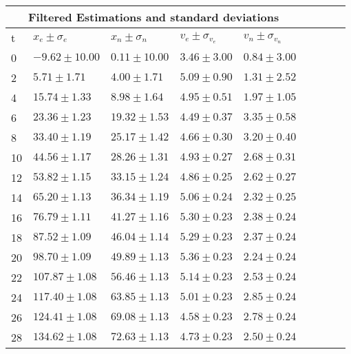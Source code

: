 \begin{table}[h] 
   \begin{center} 
      \begin{tabular}{lllllllll}\toprule 
\multicolumn{5}{c}{Filtered Estimations and standard deviations}\\ 
\midrule 
t&  $x_e \pm \sigma_e$& $x_n \pm \sigma_n$& $v_e \pm \sigma_{v_e}$& $v_n \pm \sigma_{v_n}$\\ \midrule 
0 & $   -9.62 \pm    10.00$ & $    0.11 \pm    10.00$ & $    3.46 \pm     3.00$ & $    0.84 \pm     3.00$  \\ 
2 & $    5.71 \pm     1.71$ & $    4.00 \pm     1.71$ & $    5.09 \pm     0.90$ & $    1.31 \pm     2.52$  \\ 
4 & $   15.74 \pm     1.33$ & $    8.98 \pm     1.64$ & $    4.95 \pm     0.51$ & $    1.97 \pm     1.05$  \\ 
6 & $   23.36 \pm     1.23$ & $   19.32 \pm     1.53$ & $    4.49 \pm     0.37$ & $    3.35 \pm     0.58$  \\ 
8 & $   33.40 \pm     1.19$ & $   25.17 \pm     1.42$ & $    4.66 \pm     0.30$ & $    3.20 \pm     0.40$  \\ 
10 & $   44.56 \pm     1.17$ & $   28.26 \pm     1.31$ & $    4.93 \pm     0.27$ & $    2.68 \pm     0.31$  \\ 
12 & $   53.82 \pm     1.15$ & $   33.15 \pm     1.24$ & $    4.86 \pm     0.25$ & $    2.62 \pm     0.27$  \\ 
14 & $   65.20 \pm     1.13$ & $   36.34 \pm     1.19$ & $    5.06 \pm     0.24$ & $    2.32 \pm     0.25$  \\ 
16 & $   76.79 \pm     1.11$ & $   41.27 \pm     1.16$ & $    5.30 \pm     0.23$ & $    2.38 \pm     0.24$  \\ 
18 & $   87.52 \pm     1.09$ & $   46.04 \pm     1.14$ & $    5.29 \pm     0.23$ & $    2.37 \pm     0.24$  \\ 
20 & $   98.70 \pm     1.09$ & $   49.89 \pm     1.13$ & $    5.36 \pm     0.23$ & $    2.24 \pm     0.24$  \\ 
22 & $  107.87 \pm     1.08$ & $   56.46 \pm     1.13$ & $    5.14 \pm     0.23$ & $    2.53 \pm     0.24$  \\ 
24 & $  117.40 \pm     1.08$ & $   63.85 \pm     1.13$ & $    5.01 \pm     0.23$ & $    2.85 \pm     0.24$  \\ 
26 & $  124.41 \pm     1.08$ & $   69.08 \pm     1.13$ & $    4.58 \pm     0.23$ & $    2.78 \pm     0.24$  \\ 
28 & $  134.62 \pm     1.08$ & $   72.63 \pm     1.13$ & $    4.73 \pm     0.23$ & $    2.50 \pm     0.24$  \\ 

\end{tabular}
\end{center}
\end{table}
